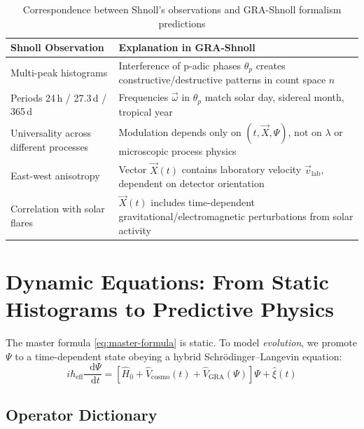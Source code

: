 \documentclass[12pt,a4paper]{article}
\theoremstyle{plain}
\theoremstyle{definition}
\theoremstyle{remark}
\newcommand{\GRA}{\text{GRA}}
\newcommand{\eff}{\text{eff}}
\newcommand{\cosmo}{\text{cosmo}}
\newcommand{\vX}{\vec{X}}
\newcommand{\vomega}{\vec{\omega}}
\newcommand{\diff}{\mathop{}\!\mathrm{d}}
\begin{document}
\begin{table}[H]
\centering
\caption{Correspondence between Shnoll's observations and GRA-Shnoll formalism predictions}
\label{tab:shnoll-explanation}
\renewcommand{\arraystretch}{1.4}
\begin{tabular}{@{}lp{10cm}@{}}
\toprule
\textbf{Shnoll Observation} & \textbf{Explanation in GRA-Shnoll} \\
\midrule
Multi-peak histograms & Interference of p-adic phases $\theta_p$ creates constructive/destructive patterns in count space $n$ \\
\addlinespace
Periods 24\,h / 27.3\,d / 365\,d & Frequencies $\vomega$ in $\theta_p$ match solar day, sidereal month, tropical year \\
\addlinespace
Universality across different processes & Modulation depends only on $(t, \vX, \Psi)$, not on $\lambda$ or microscopic process physics \\
\addlinespace
East-west anisotropy & Vector $\vX(t)$ contains laboratory velocity $\vec{v}_{\text{lab}}$, dependent on detector orientation \\
\addlinespace
Correlation with solar flares & $\vX(t)$ includes time-dependent gravitational/electromagnetic perturbations from solar activity \\
\bottomrule
\end{tabular}
\end{table}

\section{Dynamic Equations: From Static Histograms to Predictive Physics}
\label{sec:dynamics}

The master formula \eqref{eq:master-formula} is static. To model \emph{evolution}, we promote $\Psi$ to a time-dependent state obeying a hybrid Schrödinger--Langevin equation:
\begin{equation}
\boxed{
i\hbar_{\eff} \frac{\diff \Psi}{\diff t} = 
\left[ \hat{H}_0 + \hat{V}_{\cosmo}(t) + \hat{V}_{\GRA}(\Psi) \right] \Psi + \hat{\xi}(t)
}
\label{eq:hybrid-evolution}
\end{equation}

\subsection{Operator Dictionary}
\end{document}
